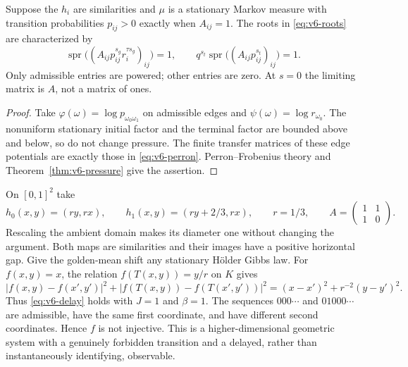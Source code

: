 \begin{corollary}\label{cor:v6-markov-matrix}
Suppose the $h_i$ are similarities and $\mu$ is a stationary Markov
measure with transition probabilities $p_{ij}>0$ exactly when $A_{ij}=1$.
The roots in \eqref{eq:v6-roots} are characterized by
\begin{equation}
 \operatorname{spr}\bigl((A_{ij}p_{ij}^{s_g}r_i^{\tau s_g})_{ij}\bigr)=1,
 \qquad
 q^{s_t}\operatorname{spr}\bigl((A_{ij}p_{ij}^{s_t})_{ij}\bigr)=1.
                                                        \label{eq:v6-perron}
\end{equation}
Only admissible entries are powered; other entries are zero. At $s=0$
the limiting matrix is $A$, not a matrix of ones.
\end{corollary}
\begin{proof}
Take $\varphi(\omega)=\log p_{\omega_0\omega_1}$ on admissible edges
and $\psi(\omega)=\log r_{\omega_0}$. The nonuniform stationary initial
factor and the terminal factor are bounded above and below, so do not
change pressure. The finite transfer matrices of these edge potentials
are exactly those in \eqref{eq:v6-perron}. Perron--Frobenius theory and
Theorem~\ref{thm:v6-pressure} give the assertion.
\end{proof}

\begin{example}
\label{ex:v6-delay}
On $[0,1]^2$ take
\[
 h_0(x,y)=(ry,rx),\qquad h_1(x,y)=(ry+2/3,rx),\qquad r=1/3,
 \qquad A=\begin{pmatrix}1&1\\1&0\end{pmatrix}.
\]
Rescaling the ambient domain makes its diameter one without changing
the argument. Both maps are similarities and their images have a
positive horizontal gap. Give the golden-mean shift any stationary
H\"older Gibbs law. For $f(x,y)=x$, the relation
$f(T(x,y))=y/r$ on $K$ gives
\[
 |f(x,y)-f(x',y')|^2+|f(T(x,y))-f(T(x',y'))|^2
 =(x-x')^2+r^{-2}(y-y')^2.
\]
Thus \eqref{eq:v6-delay} holds with $J=1$ and $\beta=1$.
The sequences $000\cdots$ and $01000\cdots$ are admissible, have the
same first coordinate, and have different second coordinates. Hence
$f$ is not injective. This is a higher-dimensional geometric system
with a genuinely forbidden transition and a delayed, rather than
instantaneously identifying, observable.
\end{example}
